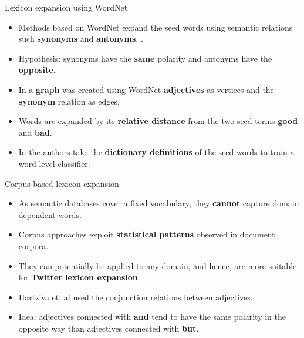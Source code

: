 \documentclass[handout]{beamer}
\begin{document}
\begin{frame}{Lexicon expansion using WordNet}
\begin{scriptsize}

\begin{itemize} 
\item Methods based on WordNet expand the seed words using semantic relations such \textbf{synonyms} and \textbf{antonyms}, \cite{Liu2004,Kim2004}.
\item Hypothesis: synonyms have the \textbf{same} polarity and antonyms have the \textbf{opposite}.
\item In \cite{kamps2004} a \textbf{graph} was created using WordNet \textbf{adjectives} as vertices and the \textbf{synonym} relation as edges. 
\item Words are expanded by its \textbf{relative distance} from the two seed terms \textbf{good} and \textbf{bad}.
\item In \cite{Esuli2005, esuli2006} the authors take the \textbf{dictionary definitions} of the seed words to train a word-level classifier. 
\end{itemize}
\end{scriptsize}
\end{frame}






\begin{frame}{Corpus-based lexicon expansion}
\begin{scriptsize}
\begin{itemize}
\item As semantic databases cover a fixed vocabulary, they \textbf{cannot} capture domain dependent words. 
\item Corpus approaches exploit \textbf{statistical patterns} observed in document corpora. 
\item They can potentially be applied to any domain, and hence, are more suitable for \textbf{Twitter lexicon expansion}.  
\item Hartziva et. al \cite{Hatziva1997} used the  conjunction relations between adjectives.
\item Idea: adjectives connected with \textbf{and} tend to have the same polarity in the opposite way than adjectives connected with \textbf{but}.
\end{itemize}
\end{scriptsize}
\end{frame}
\end{document}

